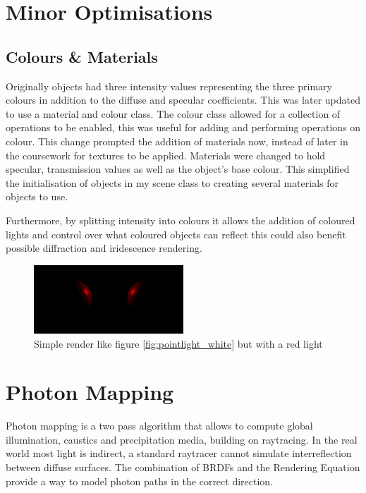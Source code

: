 \documentclass{article}
\begin{document}
\section{Minor Optimisations}
\subsection{Colours \& Materials}
Originally objects had three intensity values representing the three primary colours in addition to the diffuse and specular coefficients. This was later updated to use a material and colour class. The colour class allowed for a collection of operations to be enabled, this was useful for adding and performing operations on colour. This change prompted the addition of materials now, instead of later in the coursework for textures to be applied. Materials were changed to hold specular, transmission values as well as the object’s base colour. This simplified the initialisation of objects in my scene class to creating several materials for objects to use.

Furthermore, by splitting intensity into colours it allows the addition of coloured lights and control over what coloured objects can reflect this could also benefit possible diffraction and iridescence rendering.
\begin{figure}[h]
\centering
\includegraphics[width=0.5\textwidth]{pointlight_redlight}
\captionsetup{justification=centering,margin=0.5cm}
\caption{Simple render like figure \ref{fig:pointlight_white} but with a red light}
\label{fig:pointlight_red}
\end{figure}

\section{Photon Mapping}
Photon mapping is a two pass algorithm that allows to compute global illumination, caustics and precipitation media, building on raytracing. In the real world most light is indirect, a standard raytracer cannot simulate interreflection between diffuse surfaces. The combination of BRDFs and the Rendering Equation provide a way to model photon paths in the correct direction.
\end{document}
